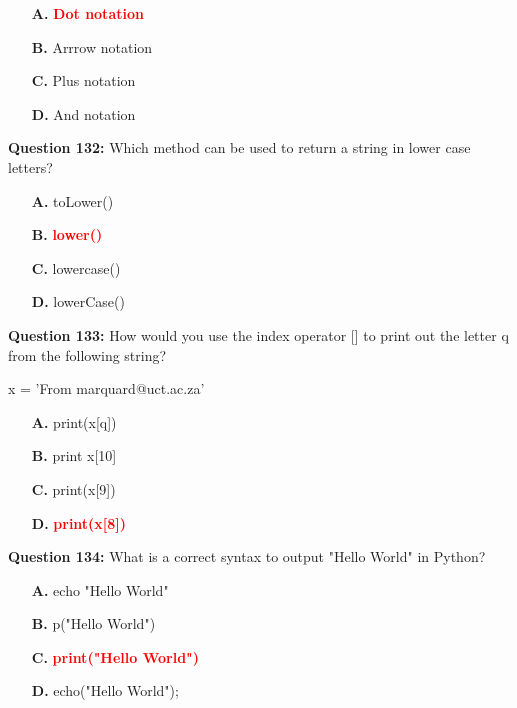 \documentclass[12pt,a4paper]{article}
\begin{document}
\begin{itemize}
    \item[\textbf{A.}] \textcolor{red}{\textbf{Dot notation}}
    \item[\textbf{B.}] Arrrow notation
    \item[\textbf{C.}] Plus notation
    \item[\textbf{D.}] And notation
\end{itemize}

\vspace{0.5cm}

\textbf{Question 132:} Which method can be used to return a string in lower case letters?

\begin{itemize}
    \item[\textbf{A.}] toLower()
    \item[\textbf{B.}] \textcolor{red}{\textbf{lower()}}
    \item[\textbf{C.}] lowercase()
    \item[\textbf{D.}] lowerCase()
\end{itemize}

\vspace{0.5cm}

\textbf{Question 133:} How would you use the index operator [] to print out the letter q from the following string?\newline

\newline
\newline

\newline
x = 'From marquard@uct.ac.za'

\begin{itemize}
    \item[\textbf{A.}] print(x[q])
    \item[\textbf{B.}] print x[10]
    \item[\textbf{C.}] print(x[9])
    \item[\textbf{D.}] \textcolor{red}{\textbf{print(x[8])}}
\end{itemize}

\vspace{0.5cm}

\textbf{Question 134:} What is a correct syntax to output "Hello World" in Python?

\begin{itemize}
    \item[\textbf{A.}] echo "Hello World"
    \item[\textbf{B.}] p("Hello World")
    \item[\textbf{C.}] \textcolor{red}{\textbf{print("Hello World")}}
    \item[\textbf{D.}] echo("Hello World");
\end{itemize}
\end{document}

